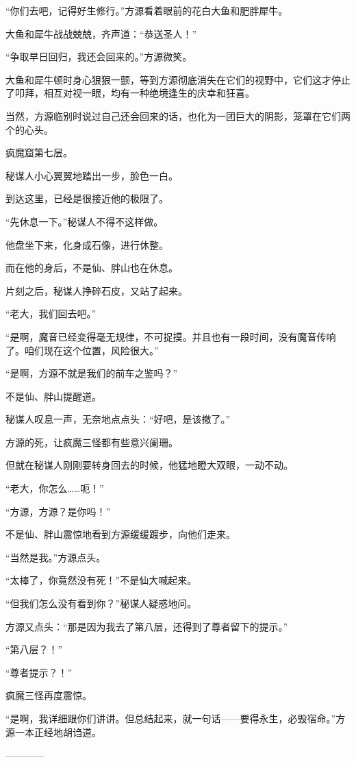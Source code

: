 \begin{this_body}
“你们去吧，记得好生修行。”方源看着眼前的花白大鱼和肥胖犀牛。

大鱼和犀牛战战兢兢，齐声道：“恭送圣人！”

“争取早日回归，我还会回来的。”方源微笑。

大鱼和犀牛顿时身心狠狠一颤，等到方源彻底消失在它们的视野中，它们这才停止了叩拜，相互对视一眼，均有一种绝境逢生的庆幸和狂喜。

当然，方源临别时说过自己还会回来的话，也化为一团巨大的阴影，笼罩在它们两个的心头。

疯魔窟第七层。

秘谋人小心翼翼地踏出一步，脸色一白。

到达这里，已经是很接近他的极限了。

“先休息一下。”秘谋人不得不这样做。

他盘坐下来，化身成石像，进行休整。

而在他的身后，不是仙、胖山也在休息。

片刻之后，秘谋人挣碎石皮，又站了起来。

“老大，我们回去吧。”

“是啊，魔音已经变得毫无规律，不可捉摸。并且也有一段时间，没有魔音传响了。咱们现在这个位置，风险很大。”

“是啊，方源不就是我们的前车之鉴吗？”

不是仙、胖山提醒道。

秘谋人叹息一声，无奈地点点头：“好吧，是该撤了。”

方源的死，让疯魔三怪都有些意兴阑珊。

但就在秘谋人刚刚要转身回去的时候，他猛地瞪大双眼，一动不动。

“老大，你怎么……呃！”

“方源，方源？是你吗！”

不是仙、胖山震惊地看到方源缓缓踱步，向他们走来。

“当然是我。”方源点头。

“太棒了，你竟然没有死！”不是仙大喊起来。

“但我们怎么没有看到你？”秘谋人疑惑地问。

方源又点头：“那是因为我去了第八层，还得到了尊者留下的提示。”

“第八层？！”

“尊者提示？！”

疯魔三怪再度震惊。

“是啊，我详细跟你们讲讲。但总结起来，就一句话——要得永生，必毁宿命。”方源一本正经地胡诌道。

------------

\end{this_body}

